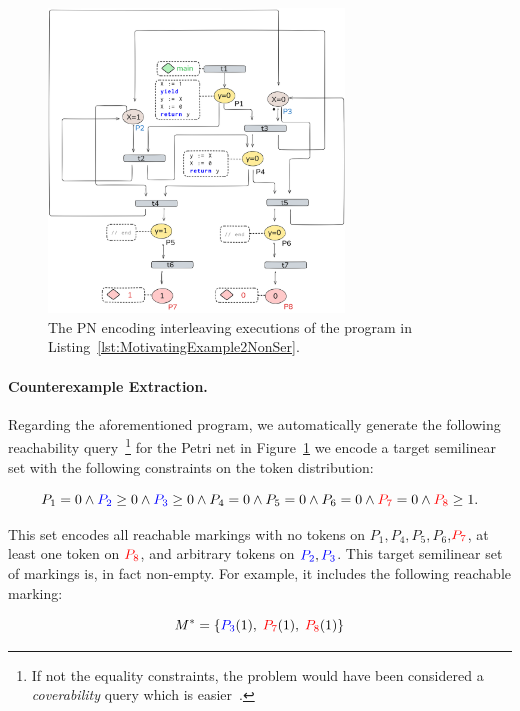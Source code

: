 \begin{figure}[!htbp]
	\centering
	\includegraphics[width=0.7\textwidth]{plots/code_2_PN_with_annotation.png}
	\caption{The PN encoding interleaving executions of the program in Listing~\ref{lst:MotivatingExample2NonSer}.}
	\label{fig:code2ExamplePN}
\end{figure}

\paragraph{Counterexample Extraction.}

Regarding the aforementioned program, we automatically generate the following reachability query~\footnote{If not the equality constraints, the problem would have been considered a \textit{coverability} query which is easier~\cite{Ra78}.} for the Petri net in Figure~\ref{fig:code2ExamplePN} we encode a target semilinear set with the following constraints on the token distribution:
 

\[
P_1 = 0 \wedge 
\textcolor{blue}{P_2} \ge 0 \wedge \textcolor{blue}{P_3} \ge 0  \wedge P_4 = 0
\wedge P_5 = 0 \wedge P_6 = 0 \wedge \textcolor{red}{P_7} = 0 \wedge \textcolor{red}{P_8} \ge 1.
\]

This set encodes all reachable markings with no tokens on $P_1,P_4,P_5,P_6$,$\textcolor{red}{P_7}$, at least one token on $\textcolor{red}{P_8}$, and arbitrary tokens on $\textcolor{blue}{P_2},\textcolor{blue}{P_3}$.  
%
This target semilinear set of markings is, in fact non-empty. For example, it includes the following reachable marking:

\[
M^* = \{\textcolor{blue}{P_3}(1),\;\textcolor{red}{P_7}(1),\;\textcolor{red}{P_8}(1)\}
\]

